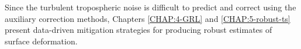  
Since the turbulent tropospheric noise is difficult to predict and correct using the auxiliary correction methods, Chapters \ref{CHAP:4-GRL} and \ref{CHAP:5-robust-ts} present data-driven mitigation strategies for producing robust estimates of surface deformation.



